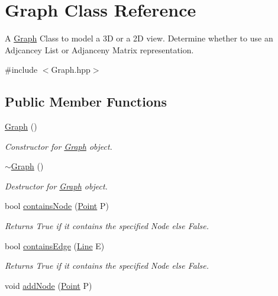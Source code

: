 \hypertarget{class_graph}{}\section{Graph Class Reference}
\label{class_graph}


A \mbox{\hyperlink{class_graph}{Graph}} Class to model a 3D or a 2D view. Determine whether to use an Adjcancey List or Adjanceny Matrix representation.  




{\ttfamily \#include $<$Graph.\+hpp$>$}

\subsection*{Public Member Functions}
\begin{DoxyCompactItemize}
\item 
\mbox{\hyperlink{class_graph_ae4c72b8ac4d693c49800a4c7e273654f}{Graph}} ()
\begin{DoxyCompactList}\small\item\em Constructor for \mbox{\hyperlink{class_graph}{Graph}} object. \end{DoxyCompactList}\item 
\mbox{\hyperlink{class_graph_a902c5b3eacb66d60752525ab23297a95}{$\sim$\+Graph}} ()
\begin{DoxyCompactList}\small\item\em Destructor for \mbox{\hyperlink{class_graph}{Graph}} object. \end{DoxyCompactList}\item 
bool \mbox{\hyperlink{class_graph_ae807fc072ac3e93c9718ee326a0d0822}{contains\+Node}} (\mbox{\hyperlink{class_point}{Point}} P)
\begin{DoxyCompactList}\small\item\em Returns True if it contains the specified Node else False. \end{DoxyCompactList}\item 
bool \mbox{\hyperlink{class_graph_af7eefeaacac324886fa73f3a2e85f20a}{contains\+Edge}} (\mbox{\hyperlink{class_line}{Line}} E)
\begin{DoxyCompactList}\small\item\em Returns True if it contains the specified Node else False. \end{DoxyCompactList}\item 
void \mbox{\hyperlink{class_graph_aaf5ccb68d053bd64b6b057783c99608c}{add\+Node}} (\mbox{\hyperlink{class_point}{Point}} P)

\end{DoxyCompactItemize}
